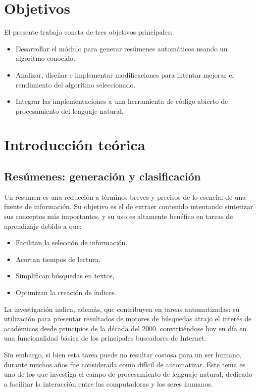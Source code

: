 \documentclass[a4paper]{article}
\begin{document}
\section{Objetivos}
El presente trabajo consta de tres objetivos principales:
\begin{itemize}
\item Desarrollar el módulo para generar resúmenes automáticos usando un algoritmo conocido.
\item Analizar, diseñar e implementar modificaciones para intentar mejorar el rendimiento del algoritmo seleccionado.
\item Integrar las implementaciones a una herramienta de código abierto de procesamiento del lenguaje natural.
\end{itemize}

\section{Introducción teórica}

\subsection{Resúmenes: generación y clasificación}
Un resumen es una reducción a términos breves y precisos de lo esencial de una fuente de información. Su objetivo es el de extraer contenido intentando sintetizar sus conceptos más importantes, y su uso es altamente benéfico en tareas de aprendizaje debido a que:
\begin{itemize}
\item Facilitan la selección de información,
\item Acortan tiempos de lectura,
\item Simplifican búsquedas en textos,
\item Optimizan la creación de índices.
\end{itemize}

La investigación indica, además, que contribuyen en tareas automatizadas: su utilización para presentar resultados de motores de búsquedas atrajo el interés de académicos desde principios de la década del 2000, convirtiéndose hoy en día en una funcionalidad básica de los principales buscadores de Internet.

Sin embargo, si bien esta tarea puede no resultar costosa para un ser humano, durante muchos años fue considerada como difícil de automatizar. Este tema es uno de los que investiga el campo de procesamiento de lenguaje natural, dedicado a facilitar la interacción entre las computadoras y los seres humanos.
\end{document}
